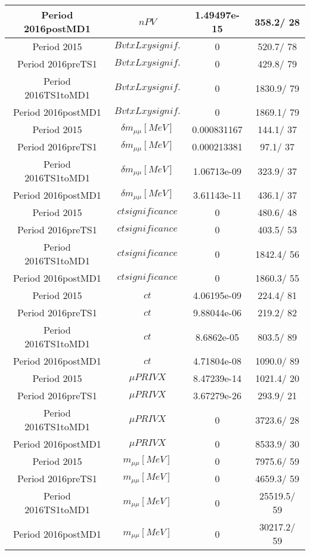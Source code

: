 \documentclass{article}
\begin{document}
\begin{longtable}{c|c|c|c}
\hline
 Period 2016postMD1 & $nPV$ & 1.49497e-15 & 358.2/ 28\\
\hline
 Period 2015 & $BvtxLxy signif.$ & 0 & 520.7/ 78\\
\hline
 Period 2016preTS1 & $BvtxLxy signif.$ & 0 & 429.8/ 79\\
\hline
 Period 2016TS1toMD1 & $BvtxLxy signif.$ & 0 & 1830.9/ 79\\
\hline
 Period 2016postMD1 & $BvtxLxy signif.$ & 0 & 1869.1/ 79\\
\hline
 Period 2015 & $\delta m_{\mu\mu} [MeV]$ & 0.000831167 & 144.1/ 37\\
\hline
 Period 2016preTS1 & $\delta m_{\mu\mu} [MeV]$ & 0.000213381 &  97.1/ 37\\
\hline
 Period 2016TS1toMD1 & $\delta m_{\mu\mu} [MeV]$ & 1.06713e-09 & 323.9/ 37\\
\hline
 Period 2016postMD1 & $\delta m_{\mu\mu} [MeV]$ & 3.61143e-11 & 436.1/ 37\\
\hline
 Period 2015 & $ct significance$ & 0 & 480.6/ 48\\
\hline
 Period 2016preTS1 & $ct significance$ & 0 & 403.5/ 53\\
\hline
 Period 2016TS1toMD1 & $ct significance$ & 0 & 1842.4/ 56\\
\hline
 Period 2016postMD1 & $ct significance$ & 0 & 1860.3/ 55\\
\hline
 Period 2015 & $ct$ & 4.06195e-09 & 224.4/ 81\\
\hline
 Period 2016preTS1 & $ct$ & 9.88044e-06 & 219.2/ 82\\
\hline
 Period 2016TS1toMD1 & $ct$ & 8.6862e-05 & 803.5/ 89\\
\hline
 Period 2016postMD1 & $ct$ & 4.71804e-08 & 1090.0/ 89\\
\hline
 Period 2015 & $\mu PRIVX$ & 8.47239e-14 & 1021.4/ 20\\
\hline
 Period 2016preTS1 & $\mu PRIVX$ & 3.67279e-26 & 293.9/ 21\\
\hline
 Period 2016TS1toMD1 & $\mu PRIVX$ & 0 & 3723.6/ 28\\
\hline
 Period 2016postMD1 & $\mu PRIVX$ & 0 & 8533.9/ 30\\
\hline
 Period 2015 & $m_{\mu\mu} [MeV]$ & 0 & 7975.6/ 59\\
\hline
 Period 2016preTS1 & $m_{\mu\mu} [MeV]$ & 0 & 4659.3/ 59\\
\hline
 Period 2016TS1toMD1 & $m_{\mu\mu} [MeV]$ & 0 & 25519.5/ 59\\
\hline
 Period 2016postMD1 & $m_{\mu\mu} [MeV]$ & 0 & 30217.2/ 59\\

\end{longtable}
\end{document}
